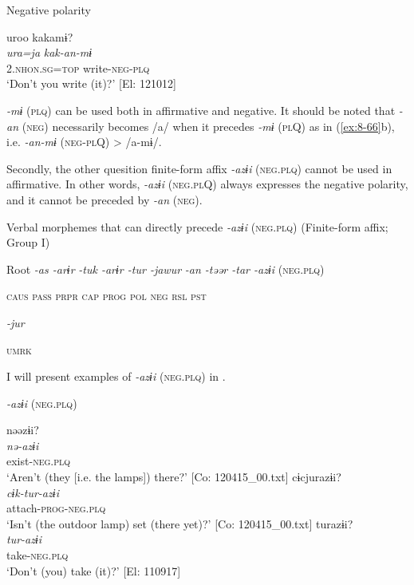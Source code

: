 \ex Negative polarity

  {\TM}
\glll  uroo  kakamɨ?\\
\textit{ura=ja}  \textit{kak-an-mɨ}\\

    2.\textsc{nhon}.\textsc{sg}=\textsc{top}  write-\textsc{neg}-\textsc{plq}\\
\glt ‘Don’t you write (it)?’ [El: 121012]

\z
\z

\textit{-mɨ} (\textsc{plq}) can be used both in affirmative and negative. It should be noted that \textit{-an} (\textsc{neg}) necessarily becomes /a/ when it precedes \textit{-mɨ} (\textsc{pl}Q) as in (\ref{ex:8-66}b), i.e. \textit{-an-mɨ} (\textsc{neg}-\textsc{pl}Q) > /a-mɨ/.

Secondly, the other quesition finite-form affix \textit{-azɨi} (\textsc{neg}.\textsc{plq}) cannot be used in affirmative. In other words, \textit{-azɨi} (\textsc{neg}.\textsc{pl}Q) always expresses the negative polarity, and it cannot be preceded by \textit{-an} (\textsc{neg}).

\ea\label{ex:8-67}
  Verbal morphemes that can directly precede \textit{-azɨi} (\textsc{neg}.\textsc{plq}) (Finite-form affix; Group I)

  Root  \textit{-as  -arɨr} %
\textit{-tuk  -arɨr  -tur  -jawur} %
\textit{-an  -təər  -tar  -azɨi} (\textsc{neg}.\textsc{plq})

    \textsc{caus}  \textsc{pass}  \textsc{prpr}  \textsc{cap}  \textsc{prog}  \textsc{pol}  \textsc{neg}  \textsc{rsl}  \textsc{pst}

          \textit{-jur}

          \textsc{umrk}
\z

I will present examples of \textit{-azɨi} (\textsc{neg}.\textsc{plq}) in .

\ea\label{ex:8-68}
  \textit{-azɨi} (\textsc{neg}.\textsc{plq})

\ea
{\TM}
\glll  nəəzɨi?\\
\textit{nə-azɨi}\\
exist-\textsc{neg}.\textsc{plq}\\
\glt ‘Aren’t (they [i.e. the lamps]) there?’ [Co: 120415\_00.txt]
\ex
{\TM}
\glll  cɨcjurazɨi?\\
\textit{cɨk-tur-azɨi}\\
attach-\textsc{prog}-\textsc{neg}.\textsc{plq}\\
\glt ‘Isn’t (the outdoor lamp) set (there yet)?’ [Co: 120415\_00.txt]
\ex
{\TM}
\glll  turazɨi?\\
\textit{tur-azɨi}\\
take-\textsc{neg}.\textsc{plq}\\
\glt ‘Don’t (you) take (it)?’ [El: 110917]
\z
\z

